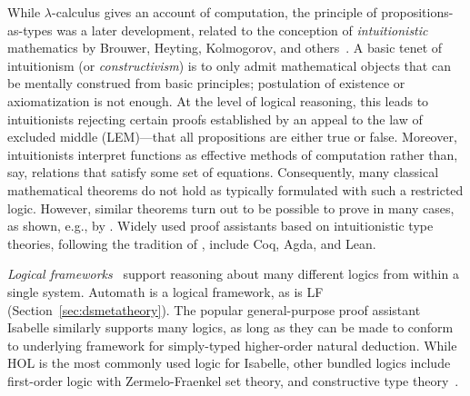 While $\lambda$-calculus gives an account of computation, the principle of propositions-as-types was a later development, related to the conception of \emph{intuitionistic} mathematics by Brouwer, Heyting, Kolmogorov, and others~\citep{Heyting1956}. A basic tenet of intuitionism (or \textit{constructivism}) is to only admit mathematical objects that can be mentally construed from basic principles; postulation of existence or axiomatization is not enough. At the level of logical reasoning, this leads to intuitionists rejecting certain proofs established by an appeal to the law of excluded middle (LEM)---that all propositions are either true or false. Moreover, intuitionists interpret functions as effective methods of computation rather than, say, relations that satisfy some set of equations. Consequently, many classical mathematical theorems do not hold as typically formulated with such a restricted logic. However, similar theorems turn out to be possible to prove in many cases, as shown, e.g., by \cite{Bishop1985}. Widely used proof assistants based on intuitionistic type theories, following the tradition of \cite{MartinLof1982a, MartinLof1982b}, include Coq, Agda, and Lean.

\textit{Logical frameworks}~\citep{Harper1993} support reasoning about many different logics from within a single system. 
Automath is a logical framework, as is LF (Section~\ref{sec:dsmetatheory}).
The popular general-purpose proof assistant Isabelle similarly supports many logics, as long as they can be made to conform to underlying framework for simply-typed higher-order natural deduction. While HOL is the most commonly used logic for Isabelle, other bundled logics include first-order logic with Zermelo-Fraenkel set theory, and constructive type theory~\citep{Paulson2000}.




